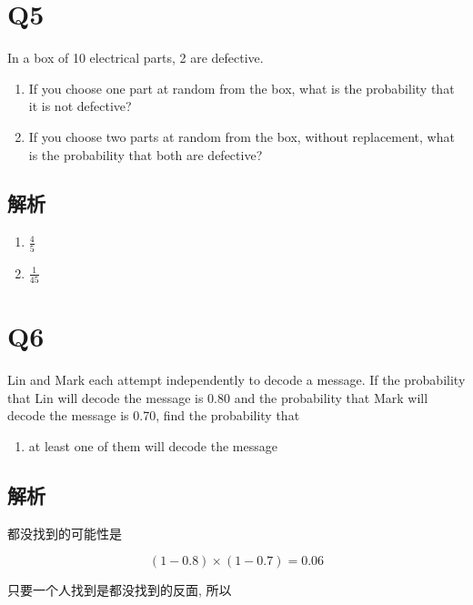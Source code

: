\section{Q5}

  In a box of 10 electrical parts, 2 are defective.

  \begin{enumerate}
    \item If you choose one part at random from the box, what is the
    probability that it is not defective?
    \item If you choose two parts at random from the box, without replacement,
    what is the probability that both are defective?
  \end{enumerate}

  \subsection{解析}

    \begin{enumerate}
      \item $ \frac{4}{5} $
      \item $ \frac{1}{45} $
    \end{enumerate}

\section{Q6}

  Lin and Mark each attempt independently to decode a message.
  If the probability that Lin will decode the message is 0.80 and the
  probability that Mark will decode the message is 0.70,
  find the probability that

  \begin{enumerate}
    \item at least one of them will decode the message
  \end{enumerate}

  \subsection{解析}

    都没找到的可能性是

    \begin{equation*}
      \left( 1 - 0.8 \right) \times \left( 1 - 0.7 \right) = 0.06
    \end{equation*}

    只要一个人找到是都没找到的反面, 所以

